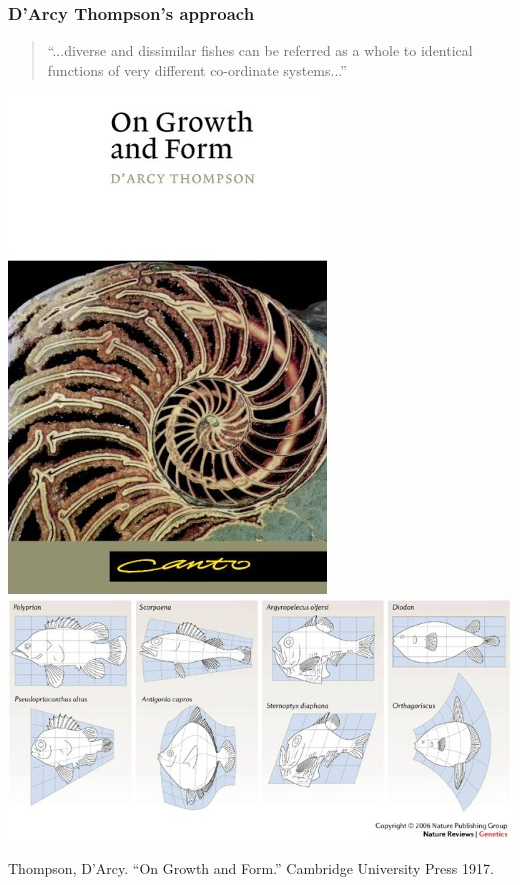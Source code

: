 \begin{frame}
\frametitle{D'Arcy Thompson's approach}
\begin{quote}
``...diverse and dissimilar fishes can be referred as a whole to identical functions of very different co-ordinate systems...''
\end{quote}
\begin{center}
\includegraphics[height=0.4\textheight]{OGAF}
\includegraphics[height=0.4\textheight]{fish}
\end{center}
\begin{tiny}
Thompson, D'Arcy. ``On Growth and Form.'' Cambridge University Press 1917.\par
\end{tiny}
\end{frame}



